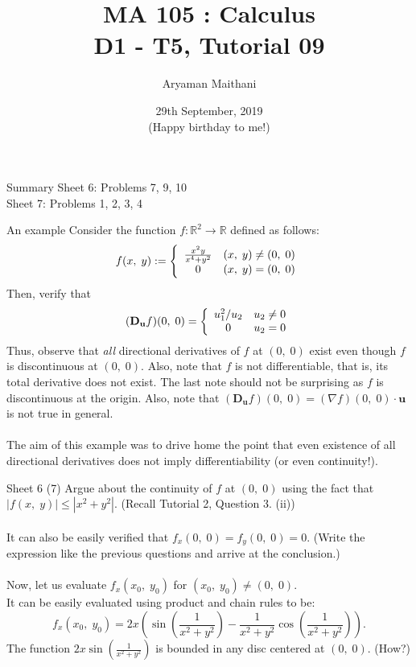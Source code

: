 \documentclass[handout, aspectratio=169]{beamer}
\title{MA 105 : Calculus\\ D1 - T5, Tutorial 09}  %
\author{Aryaman Maithani}
\date[29-09-2019]{29th September, 2019\\ \tiny (Happy birthday to me!)}               %
\institute[IITB]{IIT Bombay}
\begin{document}
\begin{frame}
	\titlepage
\end{frame}
\begin{frame}{Summary} 
	Sheet 6: Problems 7, 9, 10\\
	Sheet 7: Problems 1, 2, 3, 4
\end{frame}
\begin{frame}{An example}
	Consider the function $f:\mathbb{R}^2 \to \mathbb{R}$ defined as follows:
	\[f(x,\;y) := \left\{
	\begin{array}{c c}
		\frac{x^2y}{x^4 + y^2} & (x,\; y) \neq (0,\;0)\\
		0 & (x,\;y) = (0,\;0)
	\end{array}
	\right.\]
	Then, verify that
	\[(\mathbf{D_{u}}f)(0,\;0) = \left\{
	\begin{array}{c c}
		u_1^2/u_2 & u_2 \neq 0\\
		0 & u_2 = 0
	\end{array}
	\right.\]
	Thus, observe that \emph{all} directional derivatives of $f$ at $(0,\;0)$ exist even though $f$ is discontinuous at $(0,\;0).$ Also, note that $f$ is not differentiable, that is, its total derivative does not exist. The last note should not be surprising as $f$ is discontinuous at the origin. Also, note that $(\mathbf{D_u}f)(0,\;0) = (\nabla f)(0,\;0)\cdot\mathbf{u}$ is not true in general.\\~\\
	The aim of this example was to drive home the point that even existence of all directional derivatives does not imply differentiability (or even continuity!).
\end{frame}
\begin{frame}{Sheet 6}
	(7) Argue about the continuity of $f$ at $(0,\;0)$ using the fact that $|f(x,\;y)| \le |x^2 + y^2|.$ (Recall Tutorial 2, Question 3. (ii))\\~\\
	It can also be easily verified that $f_x(0,\;0) = f_y(0,\;0) = 0.$ (Write the expression like the previous questions and arrive at the conclusion.)\\~\\
	Now, let us evaluate $f_x(x_0,\;y_0)$ for $(x_0,\;y_0) \neq (0,\;0).$\\
	It can be easily evaluated using product and chain rules to be:
	\[f_x(x_0,\;y_0) = 2x\left(\sin\left(\frac{1}{x^2 + y^2}\right) - \frac{1}{x^2 + y^2}\cos\left(\frac{1}{x^2 + y^2}\right)\right).\]
	The function $\displaystyle2x\sin\left(\frac{1}{x^2 + y^2}\right)$ is bounded in any disc centered at $(0,\;0).$ \hfill (How?)\\
\end{frame}
	
\end{document}
